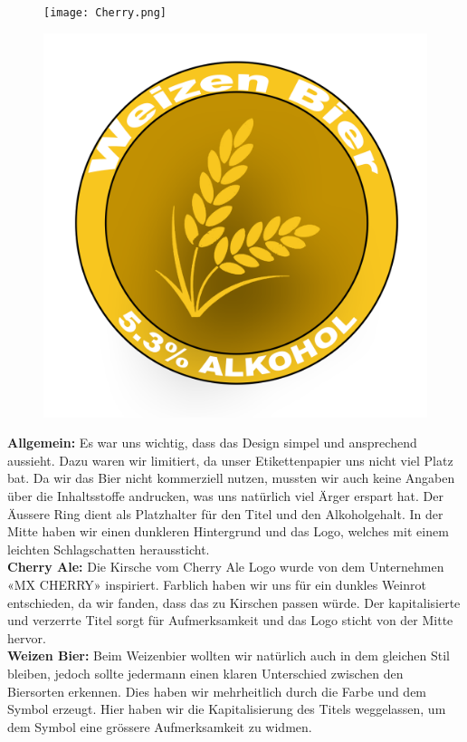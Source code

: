 \begin{figure}[!h]
    \centering
    \begin{minipage}{.5\textwidth}
      \centering
      \texttt{[image: Cherry.png]}
      \label{fig:test1}
    \end{minipage}%
    \begin{minipage}{.5\textwidth}
      \centering
      \includegraphics[width=.7\linewidth]{Figures/Wheat.png}
      \label{fig:test2}
    \end{minipage}
\end{figure}

\textbf{Allgemein:}
Es war uns wichtig, dass das Design simpel und ansprechend aussieht. Dazu waren wir limitiert, da unser Etikettenpapier uns nicht viel Platz bat. Da wir das Bier nicht kommerziell nutzen, mussten wir auch keine Angaben über die Inhaltsstoffe andrucken, was uns natürlich viel Ärger erspart hat. Der Äussere Ring dient als Platzhalter für den Titel und den Alkoholgehalt. In der Mitte haben wir einen dunkleren Hintergrund und das Logo, welches mit einem leichten Schlagschatten heraussticht.
\\
\textbf{Cherry Ale:}
Die Kirsche vom Cherry Ale Logo wurde von dem Unternehmen «MX CHERRY»  inspiriert. Farblich haben wir uns für ein dunkles Weinrot entschieden, da wir fanden, dass das zu Kirschen passen würde. Der kapitalisierte und verzerrte Titel sorgt für Aufmerksamkeit und das Logo sticht von der Mitte hervor.
\\
\textbf{Weizen Bier:}
Beim Weizenbier wollten wir natürlich auch in dem gleichen Stil bleiben, jedoch sollte jedermann einen klaren Unterschied zwischen den Biersorten erkennen. Dies haben wir mehrheitlich durch die Farbe und dem Symbol erzeugt. Hier haben wir die Kapitalisierung des Titels weggelassen, um dem Symbol eine grössere Aufmerksamkeit zu widmen. 
